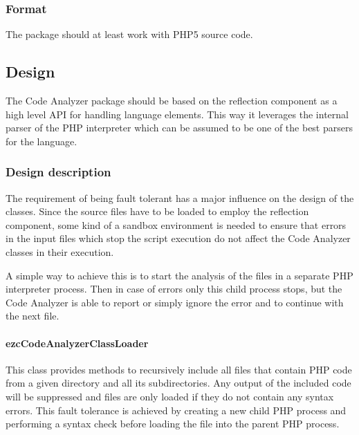 \documentclass[10pt,final,a4paper,oneside]{article}
\begin{document}
\subsubsection{Format}
The package should at least work with PHP5 source code.


\subsection{Design}\label{subsec:CodeAnalyzerDesign}
%
%

The Code Analyzer package should be based on the reflection component
as a high level API for handling language elements.
This way it leverages the internal parser of the PHP interpreter
which can be assumed to be one of the best parsers for the language.

\subsubsection{Design description}
The requirement of being fault tolerant has a major influence
on the design of the classes.
Since the source files have to be loaded
to employ the reflection component, some kind
of a sandbox environment is needed to ensure that errors
in the input files which stop the script execution
do not affect the Code Analyzer classes in their execution.

A simple way to achieve this is to start the analysis of the files
in a separate PHP interpreter process.
Then in case of errors only this child process stops,
but the Code Analyzer is able to report or simply ignore the error
and to continue with the next file.


\paragraph{ezcCodeAnalyzerClassLoader}
This class provides methods to recursively include
all files that contain PHP code from a given directory and all its subdirectories.
Any output of the included code will be suppressed
and files are only loaded if they do not contain
any syntax errors.
This fault tolerance is achieved by creating a new child PHP process
and performing a syntax check before loading the file into the parent PHP process.

\end{document}
